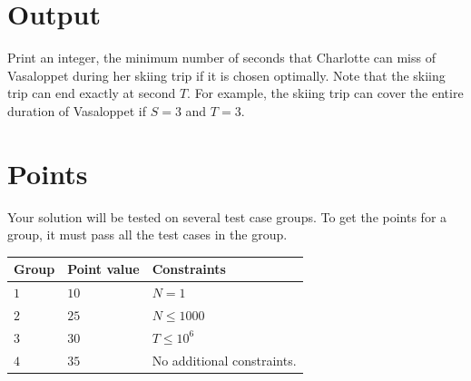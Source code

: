 \section*{Output}
Print an integer, the minimum number of seconds that Charlotte can miss of Vasaloppet during her skiing trip if it is
chosen optimally. Note that the skiing trip can end exactly at second $T$. For example, the skiing trip can cover
the entire duration of Vasaloppet if $S=3$ and $T=3$.

\section*{Points}
Your solution will be tested on several test case groups.
To get the points for a group, it must pass all the test cases in the group.

\noindent
\begin{tabular}{| l | l | p{12cm} |}
  \hline
  \textbf{Group} & \textbf{Point value} & \textbf{Constraints} \\ \hline
  $1$    & $10$       & $N=1$ \\ \hline
  $2$    & $25$       & $N \leq 1000$ \\ \hline
  $3$    & $30$       & $T \leq 10^6$ \\ \hline
  $4$    & $35$       & No additional constraints. \\ \hline
\end{tabular}

